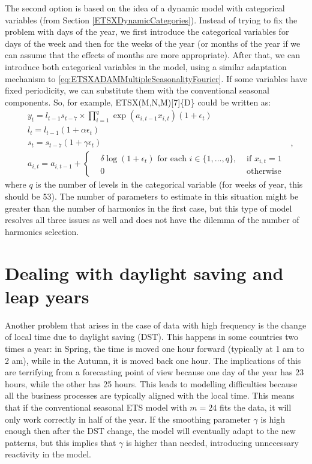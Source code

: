 \documentclass[]{book}
\theoremstyle{definition}
\theoremstyle{definition}
\theoremstyle{definition}
\theoremstyle{definition}
\theoremstyle{remark}
\begin{document}
The second option is based on the idea of a dynamic model with categorical variables (from Section \ref{ETSXDynamicCategories}). Instead of trying to fix the problem with days of the year, we first introduce the categorical variables for days of the week and then for the weeks of the year (or months of the year if we can assume that the effects of months are more appropriate). After that, we can introduce both categorical variables in the model, using a similar adaptation mechanism to \eqref{eq:ETSXADAMMultipleSeasonalityFourier}. If some variables have fixed periodicity, we can substitute them with the conventional seasonal components. So, for example, ETSX(M,N,M){[}7{]}\{D\} could be written as:
\begin{equation}
  \begin{aligned}
    & {y}_{t} = l_{t-1} s_{t-7} \times \prod_{i=1}^q \exp(a_{i,t-1} x_{i,t}) (1 + \epsilon_t) \\
    & l_t = l_{t-1} (1 + \alpha\epsilon_t) \\
    & s_t = s_{t-7} (1 + \gamma\epsilon_t) \\
    & a_{i,t} = a_{i,t-1} + \left \lbrace \begin{aligned}
      &\delta \log(1+\epsilon_t) \text{ for each } i \in \{1, \dots, q\}, &\text{ if } x_{i,t} = 1 \\
      &0 &\text{ otherwise }
    \end{aligned} \right.
  \end{aligned},
\label{eq:ETSXADAMMultipleSeasonalityCategories}
\end{equation}
where \(q\) is the number of levels in the categorical variable (for weeks of year, this should be 53). The number of parameters to estimate in this situation might be greater than the number of harmonics in the first case, but this type of model resolves all three issues as well and does not have the dilemma of the number of harmonics selection.

\hypertarget{MultipleFrequenciesDSTandLeap}{%
\section{Dealing with daylight saving and leap years}\label{MultipleFrequenciesDSTandLeap}}

Another problem that arises in the case of data with high frequency is the change of local time due to daylight saving (DST). This happens in some countries two times a year: in Spring, the time is moved one hour forward (typically at 1 am to 2 am), while in the Autumn, it is moved back one hour. The implications of this are terrifying from a forecasting point of view because one day of the year has 23 hours, while the other has 25 hours. This leads to modelling difficulties because all the business processes are typically aligned with the local time. This means that if the conventional seasonal ETS model with \(m=24\) fits the data, it will only work correctly in half of the year. If the smoothing parameter \(\gamma\) is high enough then after the DST change, the model will eventually adapt to the new patterns, but this implies that \(\gamma\) is higher than needed, introducing unnecessary reactivity in the model.
\end{document}
